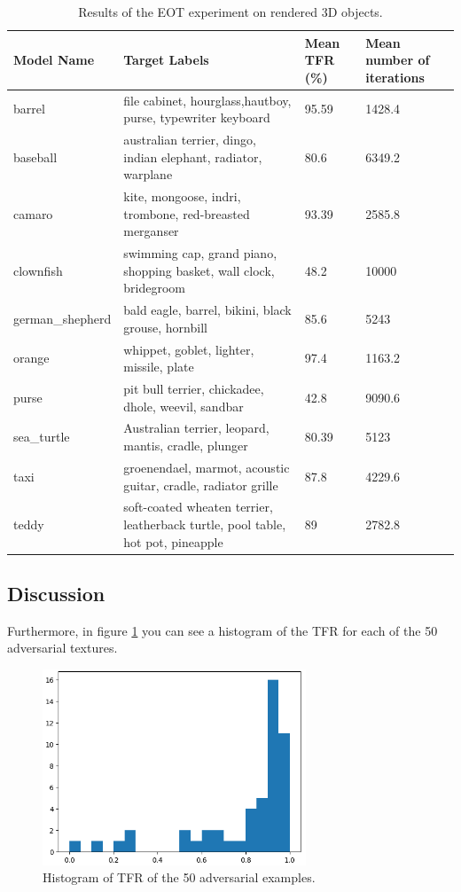 \begin{table}
\caption{Results of the EOT experiment on rendered 3D objects.}
\label{table:eot_results}
\begin{tabular}{|p{2.6cm} | p{6.5cm} | p{2cm}| p{2cm}|} 
 \hline
 Model Name & Target Labels & Mean TFR (\%) & Mean number of iterations \\
 \hline
 barrel & file cabinet, hourglass,hautboy, purse, typewriter keyboard & 95.59 & 1428.4 \\ 
 \hline
 baseball & australian terrier, dingo, indian elephant, radiator, warplane & 80.6 & 6349.2 \\
 \hline
 camaro & kite, mongoose, indri, trombone, red-breasted merganser & 93.39 & 2585.8 \\
 \hline
 clownfish & swimming cap, grand piano, shopping basket, wall clock, bridegroom & 48.2 & 10000 \\
 \hline
 german\_shepherd & bald eagle, barrel, bikini, black grouse, hornbill & 85.6 & 5243 \\
 \hline
 orange & whippet, goblet, lighter, missile, plate & 97.4 & 1163.2 \\
 \hline
 purse & pit bull terrier, chickadee, dhole, weevil, sandbar & 42.8 & 9090.6 \\
 \hline
 sea\_turtle & Australian terrier, leopard, mantis, cradle, plunger & 80.39 & 5123 \\
 \hline
 taxi & groenendael, marmot, acoustic guitar, cradle, radiator grille & 87.8 & 4229.6 \\
 \hline
 teddy & soft-coated wheaten terrier, leatherback turtle, pool table, hot pot, pineapple & 89 & 2782.8 \\
 \hline
\end{tabular}
\end{table}

\subsection{Discussion}

Furthermore, in figure \ref{fig:eot_histogram} you can see a histogram of the TFR for each of the 50 adversarial textures.

\begin{figure}[ht]
    \centering
    \includegraphics[width=0.7\textwidth]{graphics/eot_histogram.PNG}
    \caption{Histogram of TFR of the 50 adversarial examples.}
    \label{fig:eot_histogram}
\end{figure}

